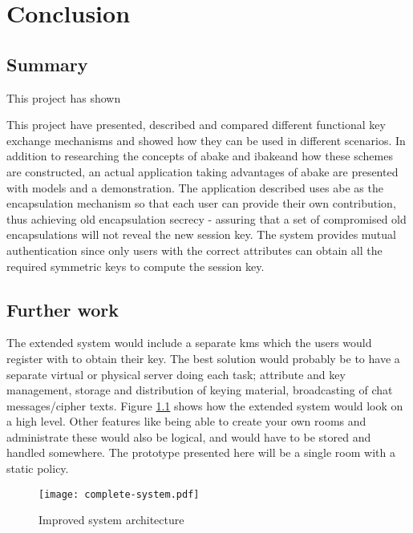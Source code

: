 \chapter{Conclusion}\label{cha:conclusion}

\section{Summary}
This project has shown


This project have presented, described and compared different functional key exchange mechanisms and showed how they can be used in different scenarios. In addition to researching the concepts of \gls{abake} and \gls{ibake}and how these schemes are constructed, an actual application taking advantages of \gls{abake} are presented with models and a demonstration. The application described uses \gls{abe} as the encapsulation mechanism so that each user can provide their own contribution, thus achieving old encapsulation secrecy - assuring that a set of compromised old encapsulations will not reveal the new session key. The system provides mutual authentication since only users with the correct attributes can obtain all the required symmetric keys to compute the session key. 



\section{Further work}
The extended system would include a separate \gls{kms} which the users would register with to obtain their key. The best solution would probably be to have a separate virtual or physical server doing each task; attribute and key management, storage and distribution of keying material, broadcasting of chat messages/cipher texts. Figure \ref{fig:improved} shows how the extended system would look on a high level. Other features like being able to create your own rooms and administrate these would also be logical, and would have to be stored and handled somewhere. The prototype presented here will be a single room with a static policy.

\begin{figure}
\centering
\texttt{[image: complete-system.pdf]}
\caption{Improved system architecture}
\label{fig:improved}
\end{figure}

